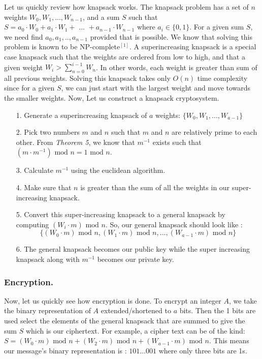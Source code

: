 \documentclass[manuscript,screen,review,nonacm]{acmart}
\begin{document}
{Let us quickly review how knapsack works. The knapsack problem has a set of $n$ weights $W_0,W_1,...,W_{n-1}$, and a sum $S$ such that $S = a_0\cdot W_0 + a_1\cdot W_1 + \text{ ... }  + a_{n-1}\cdot W_{n-1}$ where $a_i \in \{0,1\}$. For a given sum $S$, we need find $a_0, a_1, .., a_{n-1}$ provided that is possible. We know that solving this problem is known to be NP-complete$^{[1]}$.\newline
A superincreasing knapsack is a special case knapsack such that the weights are ordered from low to high, and that a given weight $W_i > \sum_{n=0}^{i-1} W_n$. In other words, each weight is greater than sum of all previous weights. Solving this knapsack takes only $O(n)$ time complexity since for a given $S$, we can just start with the largest weight and move towards the smaller weights.\newline
Now, Let us construct a knapsack cryptosystem.
\begin{enumerate}
    \item[1.] Generate a superincreasing knapsack of $a$ weights: $\{W_0, W_1, ..., W_{a-1}\}$
    \item[2.] Pick two numbers $m$ and $n$ such that $m$ and $n$ are relatively prime to each other. From \textit{Theorem 5}, we know that $m^{-1}$ exists such that $(m\cdot m^{-1}) \text { mod } n = 1 \text { mod } n$.
    \item[3.] Calculate $m^{-1}$ using the euclidean algorithm.
    \item[4.] Make sure that $n$ is greater than the sum of all the weights in our super-increasing knapsack.
    \item[5.] Convert this super-increasing knapsack to a general knapsack by computing $(W_i \cdot m) \text{ mod } n $. So, our general knapsack should look like : \[\{(W_0 \cdot m) \text{ mod } n, (W_1 \cdot m) \text{ mod } n, ..., (W_{a-1} \cdot m) \text{ mod } n\}\]
    \item[6.] The general knapsack becomes our public key while the super increasing knapsack along with $m^{-1}$ becomes our private key.
\end{enumerate}

\subsubsection*{Encryption.\newline}
Now, let us quickly see how encryption is done. To encrypt an integer $A$, we take the binary representation of $A$ extended/shortened to $a$ bits. Then the 1 bits are used select the elements of the general knapsack that are summed to give the sum $S$ which is our ciphertext. For example, a cipher text can be of the kind: $S = (W_0 \cdot m) \text{ mod } n +(W_{2} \cdot m) \text{ mod } n + (W_{a-1} \cdot m) \text{ mod } n $. This means our message's binary representation is : $101\ldots001$
 where only three bits are 1s.

}
\end{document}
